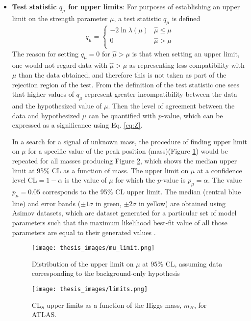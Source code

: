 \documentclass[a4paper, oneside, 11pt, openright]{book}
\begin{document}
\begin{itemize}
 				\item \textbf{Test statistic $q_\mu$ for upper limits}: For purposes of establishing an upper limit on the strength parameter $\mu$, a test statistic $q_\mu$ is defined
 				\begin{equation}\label{eq:q_mu_limit}
 					q_\mu = 
 					\begin{cases}
 						-2\ln\lambda(\mu) & \hat{\mu}\leq\mu \\
 						0 & \hat{\mu}>\mu \\
 					\end{cases}
 				\end{equation}
 				The reason for setting $q_\mu=0$ for $\hat{\mu}>\mu$ is that when setting an upper limit, one would not regard data with $\hat{\mu}>\mu$ as representing less compatibility with $\mu$ than the data obtained, and therefore this is not taken as part of the rejection region of the test. From the definition of the test statistic one sees that higher values of $q_\mu$ represent greater incompatibility between the data and the hypothesized value of $\mu$. Then the level of agreement between the data and hypothesized $\mu$ can be quantified with $p$-value, which can be expressed as a significance using Eq. \ref{eq:Z}.
 				
 				In a search for a signal of unknown mass, the procedure of finding upper limit on $\mu$ for a specific value of the peak position (mass)(Figure \ref{fig:mu_limit}) would be repeated for all masses producing Figure \ref{fig:limits}, which shows the median upper limit at 95\% CL as a function of mass. The upper limit on $\mu$ at a confidence level CL$=1-\alpha$ is the value of $\mu$ for which the $p$-value is $p_\mu=\alpha$. The value $p_\mu = 0.05$ corresponds to the 95\% CL upper limit. The median (central blue line) and error bands ($\pm1\sigma$ in green, $\pm2\sigma$ in yellow) are obtained using Asimov datasets, which are dataset generated for a particular set of model parameters such that the maximum likelihood best-fit value of all those parameters are equal to their generated values \cite{Asimov}. 
 				\begin{figure}
 					\centering
 					\texttt{[image: thesis\_images/mu\_limit.png]}			
 					\caption{Distribution of the upper limit on $\mu$ at 95\% CL, assuming data corresponding to the background-only hypothesis}
 					\label{fig:mu_limit}
 				\end{figure}
	 			\begin{figure}[!h]
	 				\centering
	 				\texttt{[image: thesis\_images/limits.png]}			
	 				\caption{CL$_S$ upper limits as a function of the Higgs mass, $m_H$, for ATLAS.}
	 				\label{fig:limits}
	 			\end{figure}
 			\end{itemize}
 			
\end{document}
